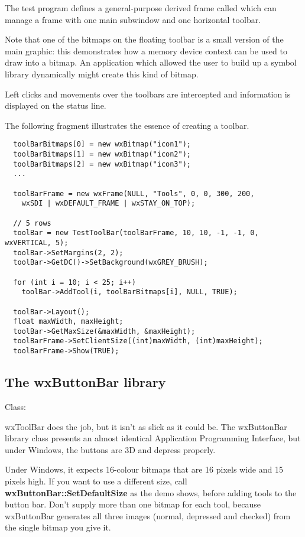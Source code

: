 The test program defines a general-purpose derived frame called
 which can manage a frame with one main subwindow
and one horizontal toolbar.

Note that one of the bitmaps on the floating toolbar is a small version of the
main graphic: this demonstrates how a memory device context can be used to
draw into a bitmap. An application which allowed the user to build up a symbol
library dynamically might create this kind of bitmap.

Left clicks and movements over the toolbars are intercepted and information
is displayed on the status line.

The following fragment illustrates the essence of creating a toolbar.

\begin{verbatim}
  toolBarBitmaps[0] = new wxBitmap("icon1");
  toolBarBitmaps[1] = new wxBitmap("icon2");
  toolBarBitmaps[2] = new wxBitmap("icon3");
  ...

  toolBarFrame = new wxFrame(NULL, "Tools", 0, 0, 300, 200,
    wxSDI | wxDEFAULT_FRAME | wxSTAY_ON_TOP);

  // 5 rows
  toolBar = new TestToolBar(toolBarFrame, 10, 10, -1, -1, 0, wxVERTICAL, 5);
  toolBar->SetMargins(2, 2);
  toolBar->GetDC()->SetBackground(wxGREY_BRUSH);

  for (int i = 10; i < 25; i++)
    toolBar->AddTool(i, toolBarBitmaps[i], NULL, TRUE);

  toolBar->Layout();
  float maxWidth, maxHeight;
  toolBar->GetMaxSize(&maxWidth, &maxHeight);
  toolBarFrame->SetClientSize((int)maxWidth, (int)maxHeight);
  toolBarFrame->Show(TRUE);
\end{verbatim}

\subsection{The wxButtonBar library}\label{wxbuttonbaroverview}


Class: 

wxToolBar does the job, but it isn't as slick as it could be. The wxButtonBar
library class presents an almost identical Application Programming
Interface, but under Windows, the buttons are 3D and depress properly.

Under Windows, it expects 16-colour bitmaps that are 16 pixels wide and 15 pixels
high. If you want to use a different size, call {\bf wxButtonBar::SetDefaultSize}\rtfsp
as the demo shows, before adding tools to the button bar. Don't supply more than
one bitmap for each tool, because wxButtonBar generates all three images (normal,
depressed and checked) from the single bitmap you give it.

